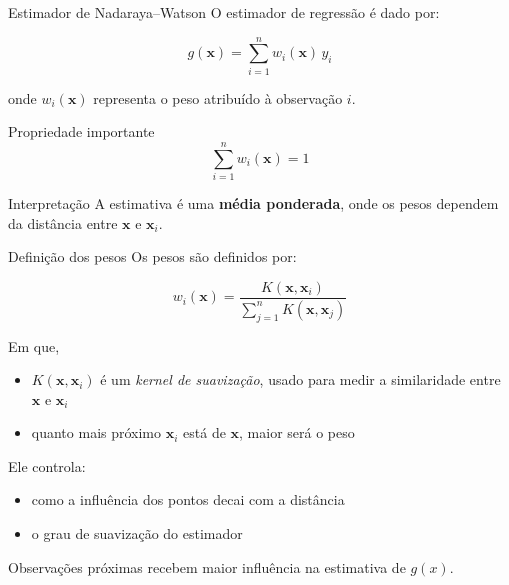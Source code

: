 \documentclass[
  ignorenonframetext,
  aspectratio=169,
]{beamer}
\providecommand{\tightlist}{%
  \setlength{\itemsep}{0pt}\setlength{\parskip}{0pt}}
\begin{document}
\begin{frame}
\begin{block}{Estimador de Nadaraya--Watson}
\label{estimador-de-nadarayawatson}
O estimador de regressão é dado por:

\[
g(\mathbf{x}) = \sum_{i=1}^{n} w_i(\mathbf{x})\,y_i
\]

onde \(w_i(\mathbf{x})\) representa o peso atribuído à observação \(i\).
\end{block}

\begin{block}{Propriedade importante}
\label{propriedade-importante}
\[
\sum_{i=1}^{n} w_i(\mathbf{x}) = 1
\]
\end{block}
\end{frame}

\begin{frame}
\begin{block}{Interpretação}
\label{interpretauxe7uxe3o-2}
A estimativa é uma \textbf{média ponderada}, onde os pesos dependem da
distância entre \(\mathbf{x}\) e \(\mathbf{x}_i\).
\end{block}

\begin{block}{Definição dos pesos}
\label{definiuxe7uxe3o-dos-pesos}
Os pesos são definidos por:

\[
w_i(\mathbf{x}) = \frac{K(\mathbf{x}, \mathbf{x}_i)}{\sum_{j=1}^{n} K(\mathbf{x}, \mathbf{x}_j)}
\]
\end{block}
\end{frame}

\begin{frame}
Em que,

\begin{itemize}
\tightlist
\item
  \(K(\mathbf{x}, \mathbf{x}_i)\) é um \emph{kernel de suavização},
  usado para medir a similaridade entre \(\mathbf{x}\) e
  \(\mathbf{x}_i\)
\item
  quanto mais próximo \(\mathbf{x}_i\) está de \(\mathbf{x}\), maior
  será o peso
\end{itemize}

Ele controla:

\begin{itemize}
\tightlist
\item
  como a influência dos pontos decai com a distância\\
\item
  o grau de suavização do estimador
\end{itemize}

Observações próximas recebem maior influência na estimativa de \(g(x)\).
\end{frame}
\end{document}
